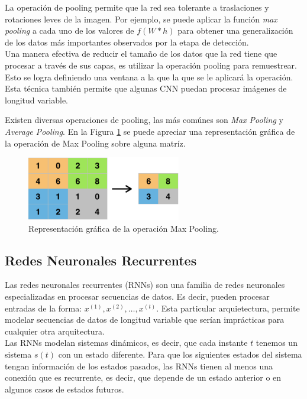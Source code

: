 	La operación de pooling permite que la red sea tolerante a traslaciones y rotaciones leves de la imagen. Por ejemplo, se puede aplicar la función \textit{max pooling} a cada uno de los valores de $f(W*h)$ para obtener una generalización de los datos más importantes observados por la etapa de detección. \\
	
	Una manera efectiva de reducir el tamaño de los datos que la red tiene que procesar a través de sus capas, es utilizar la operación pooling para remuestrear. Esto se logra definiendo una ventana a la que la que se le aplicará la operación. Esta técnica también permite que algunas CNN puedan procesar imágenes de longitud variable.

	Existen diversas operaciones de pooling, las más comúnes son \textit{Max Pooling} y \textit{Average Pooling}. En la Figura \ref{fig:max-pooling} se puede apreciar una representación gráfica de la operación de Max Pooling sobre alguna matríz.

	\begin{figure}[H]
		\centering
		\includegraphics[width=0.6\textwidth]{capitulo2/images/max_pooling}
		\caption{Representación gráfica de la operación Max Pooling.}
		\label{fig:max-pooling}
	\end{figure}
    
   	
\subsection{Redes Neuronales Recurrentes}

Las redes neuronales recurrentes (RNNs) son una familia de redes neuronales especializadas en procesar secuencias de datos. Es decir, pueden procesar entradas de la forma: $x^{(1)}, x^{(2)}, \dots, x^{(t)}$. Esta particular arquietectura, permite modelar secuencias de datos de longitud variable que serían imprácticas para cualquier otra arquitectura. \\

Las RNNs modelan sistemas dinámicos, es decir, que cada instante $t$ tenemos un sistema $s(t)$ con un estado diferente. Para que los siguientes estados del sistema tengan información de los estados pasados, las RNNs tienen al menos una conexión que es recurrente, es decir, que depende de un estado anterior o en algunos casos de estados futuros. \\

